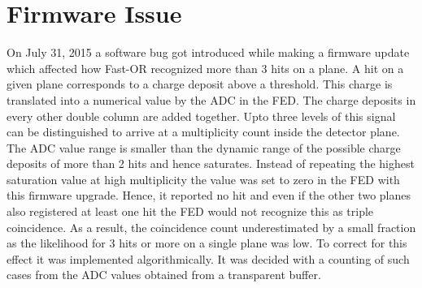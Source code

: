 \section{Firmware Issue} \label{sec:firmware}



On July 31, 2015 a software bug got introduced while making a firmware update which affected how Fast-OR recognized more than 3 hits on a plane. A hit on a given plane corresponds to a charge deposit above a threshold. This charge is translated into a numerical value by the ADC in the FED. The charge deposits in every other double column are added together. Upto three levels of this signal can be distinguished to arrive at a multiplicity count inside the detector plane. The ADC value range is smaller than the dynamic range of the possible charge deposits of more than 2 hits and hence saturates. Instead of repeating the highest saturation value at high multiplicity the value was set to zero in the FED with this firmware upgrade. Hence, it reported no hit and even if the other two planes also registered at least one hit the FED would not recognize this as triple coincidence. As a result, the coincidence count underestimated by a small fraction as the likelihood for 3 hits or more on a single plane was low. To correct for this effect it was implemented algorithmically. It was decided with a counting of such cases from the ADC values obtained from a transparent buffer. 



